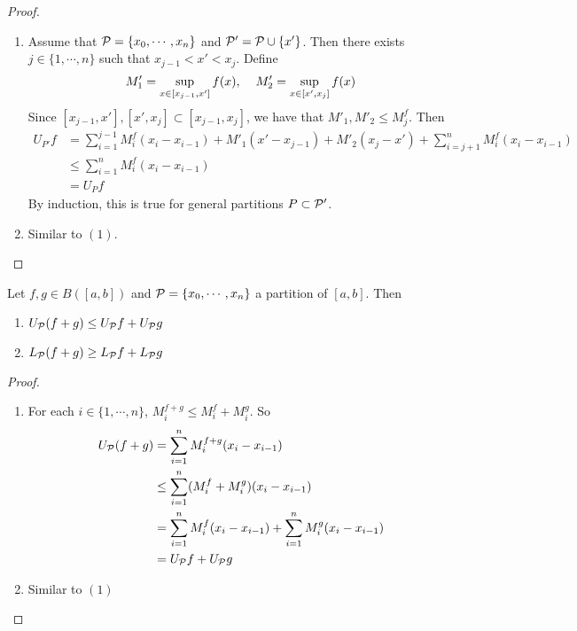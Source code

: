 \documentclass{book}
\begin{document}
	\begin{proof} \
		\begin{enumerate}
			\item Assume that $\mathcal{P} = \{x_0, \cdots, x_n\}$ and $\mathcal{P}' = \mathcal{P} \cup \{x'\}$. Then there exists $j \in \{1, \cdots, n\}$ such that $x_{j-1} < x' < x_j$. Define $$M'_1 = \sup_{x \in [x_{j-1}, x']} f(x), \hspace{.4cm} M'_2 = \sup_{x \in [x', x_{j}]} f(x)$$
			Since $[x_{j-1}, x'], [x', x_j] \subset [x_{j-1}, x_j]$, we have that $M'_1, M'_2 \leq  M^f_j$. Then 
			\begin{align*}
				U_{P'}f 
				&= \sum_{i =1}^{j-1} M^f_i(x_i - x_{i-1}) + M'_1(x' - x_{j-1}) + M'_2(x_j - x') + \sum_{i =j+1}^n M^f_i(x_i - x_{i-1})  \\
				&\leq   \sum_{i =1}^{n} M^f_i(x_i - x_{i-1}) \\
				&= U_P f 
			\end{align*}
			By induction, this is true for general partitions $P \subset \mathcal{P}'$.
			\item Similar to $(1)$.
		\end{enumerate}
	\end{proof}

	\begin{ex}  
		Let $f, g \in B([a,b])$ and $\mathcal{P} = \{x_0, \cdots, x_n\}$ a partition of $[a,b]$. Then 
		\begin{enumerate}
			\item $U_{\mathcal{P}}(f+g) \leq U_{\mathcal{P}} f + U_{\mathcal{P}} g$
			\item $L_{\mathcal{P}}(f+g) \geq L_{\mathcal{P}} f + L_{\mathcal{P}} g$
		\end{enumerate}
	\end{ex}

	\begin{proof} \
		\begin{enumerate}
			\item For each $i \in \{1, \cdots, n\}$, $M^{f+g}_i \leq M^f_i + M^g_i$. So 
			\begin{align*}
				U_{\mathcal{P}} (f+g) 
				&= \sum_{i=1}^n M^{f+g}_i (x_i - x_{i-1}) \\
				& \leq \sum_{i=1}^n (M^f_i + M^g_i)(x_i - x_{i-1}) \\
				&= \sum_{i=1}^n M^f_i(x_i - x_{i-1}) + \sum_{i=1}^n M^g_i(x_i - x_{i-1}) \\
				&= U_{\mathcal{P}} f + U_{\mathcal{P}} g
			\end{align*}
			\item Similar to $(1)$
		\end{enumerate}
	\end{proof}
\end{document}
